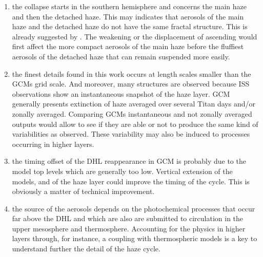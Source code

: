 \begin{enumerate}
    \item the collapse starts in the southern hemisphere and concerns the main haze and then the detached haze. This
may indicates that aerosols of the main haze and the detached haze do not have the same fractal structure. This is
already suggested by \cite{Larson2015}. The weakening or the displacement of ascending would first affect the more
compact aerosols of the main haze before the fluffiest aerosols of the detached haze that can remain suspended more
easily.
    \item the finest details found in this work occurs at length scales smaller than the GCMs grid scale. And moreover,
many structures are observed because ISS observations show an instantaneous snapshot of the haze layer. GCM generally
presents extinction of haze averaged over several Titan days and/or zonally averaged. Comparing GCMs instantaneous and
not zonally averaged outputs would allow to see if they are able or not to produce the same kind of variabilities as
observed. These variability may also be induced to processes occurring in higher layers.
    \item the timing offset of the DHL reappearance in GCM is probably due to the model top levels which are generally too
low. Vertical extension of the models, and of the haze layer could improve the timing of the cycle. This is obviously
a matter of technical improvement.
    \item the source of the aerosols depends on the photochemical processes that occur far above the DHL and which are
also are submitted to circulation in the upper mesosphere and thermosphere. Accounting for the physics in higher layers
through, for instance, a coupling with thermospheric models is a key to understand further the detail of the haze cycle.
\end{enumerate}